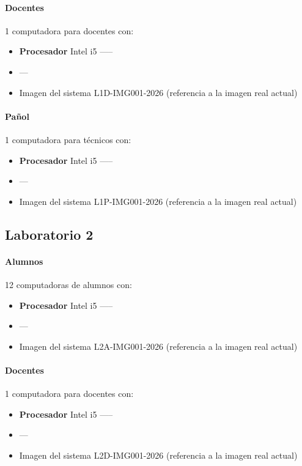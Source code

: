 {\paragraph{Docentes} 1 computadora para docentes con:
\begin{itemize}
    \item \textbf{Procesador} Intel i5 -----
    \item ---
    \item Imagen del sistema L1D-IMG001-2026 (referencia a la imagen real actual)
\end{itemize}

\paragraph{Pañol} 1 computadora para técnicos con:
\begin{itemize}
    \item \textbf{Procesador} Intel i5 -----
    \item ---
    \item Imagen del sistema L1P-IMG001-2026 (referencia a la imagen real actual)
\end{itemize}

\subsection{Laboratorio 2}
\paragraph{Alumnos} 12 computadoras de alumnos con:
\begin{itemize}
    \item \textbf{Procesador} Intel i5 -----
    \item ---
    \item Imagen del sistema L2A-IMG001-2026 (referencia a la imagen real actual)
\end{itemize}

\paragraph{Docentes} 1 computadora para docentes con:
\begin{itemize}
    \item \textbf{Procesador} Intel i5 -----
    \item ---
    \item Imagen del sistema L2D-IMG001-2026 (referencia a la imagen real actual)
\end{itemize}

}
